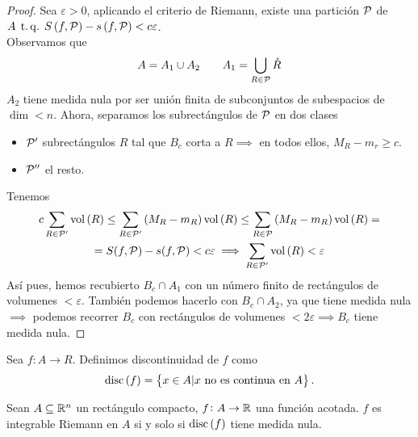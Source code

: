 \begin{proof}
    Sea $\varepsilon > 0$, aplicando el criterio de Riemann, existe una partición $\mathcal{P}$ de $A \operatorname{\;t.q.\;} S \left( f, \mathcal{P} \right) - s \left( f, \mathcal{P} \right) < c\varepsilon$. \\
    Observamos que
    \[
        A = A_1 \cup A_2 \qquad A_1 = \bigcup_{R \in \mathcal{P}} \mathring{R}
    \]
    $A_2$ tiene medida nula por ser unión finita de subconjuntos de subespacios de
    $\dim < n$. Ahora, separamos los subrectángulos de $\mathcal{P}$ en dos clases
    \begin{itemize}
        \item $\mathcal{P}^\prime$ subrectángulos $R$ tal que $B_c$ corta a $R \implies$ en
            todos ellos, $M_R - m_r \geq c$.
        \item $\mathcal{P}^{\prime\prime}$ el resto.
    \end{itemize}
    Tenemos
    \begin{gather*}
        c \sum_{R \in \mathcal{P}^\prime}\operatorname{vol}\left( R \right) \leq
        \sum_{R \in \mathcal{P}^\prime}\left( M_R - m_R \right) \operatorname{vol}\left( R \right) \leq
        \sum_{R \in \mathcal{P}} \left( M_R -m_R \right)\operatorname{vol} \left( R \right) =\\=
        S(f, \mathcal{P}) - s(f, \mathcal{P}) < c\varepsilon \implies \sum_{R \in \mathcal{P}^\prime}
        \operatorname{vol}\left( R \right) < \varepsilon
    \end{gather*}
    Así pues, hemos recubierto $B_c \cap A_1$ con un número finito de rectángulos de
    volumenes $< \varepsilon$. Tambi\'en podemos hacerlo con $B_c \cap A_2$, ya que
    tiene medida nula $\implies$ podemos recorrer $B_c$ con rectángulos de volumenes
    $< 2\varepsilon \implies B_c$ tiene medida nula.
\end{proof}

\begin{defi}
    Sea $f \colon A \to R$. Definimos discontinuidad de $f$ como
    \[
        \operatorname{disc}\left( f \right) = \left\{x \in A \vert x \text{ no es continua en }A\right\}.
    \]
\end{defi}

\begin{teo}[de Lebesgue]
    Sean $A \subseteq \mathbb{R}^n$ un rectángulo compacto, $f \colon A \to \mathbb{R}$ una
    función acotada. $f$ es integrable Riemann en $A$ si y solo si
    $\operatorname{disc}\left( f \right)$ tiene medida nula.
\end{teo}

